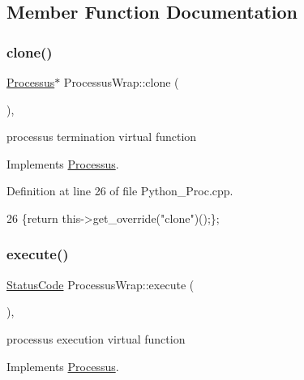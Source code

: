 \subsection{Member Function Documentation}
\mbox{\label{structProcessusWrap_a6582297a477b1cd1594f90a80691fca3}} 
\subsubsection{\texorpdfstring{clone()}{clone()}}
{\footnotesize\ttfamily \hyperlink{classProcessus}{Processus}$\ast$ Processus\+Wrap\+::clone (\begin{DoxyParamCaption}{ }\end{DoxyParamCaption})\hspace{0.3cm}{\ttfamily [inline]}, {\ttfamily [virtual]}}

processus termination virtual function 

Implements \hyperlink{classProcessus_aca8856f6d6d7b7e1fe941f298dcbb502}{Processus}.



Definition at line 26 of file Python\+\_\+\+Proc.\+cpp.


\begin{DoxyCode}
26 \{\textcolor{keywordflow}{return} this->get\_override(\textcolor{stringliteral}{"clone"})();\};
\end{DoxyCode}
\mbox{\label{structProcessusWrap_a099df299b3dadd548c44e7e6d94f027a}} 
\subsubsection{\texorpdfstring{execute()}{execute()}}
{\footnotesize\ttfamily \hyperlink{classStatusCode}{Status\+Code} Processus\+Wrap\+::execute (\begin{DoxyParamCaption}{ }\end{DoxyParamCaption})\hspace{0.3cm}{\ttfamily [inline]}, {\ttfamily [virtual]}}

processus execution virtual function 

Implements \hyperlink{classProcessus_a63767a63a1fb0055c5aa45b21a4a5d58}{Processus}.



